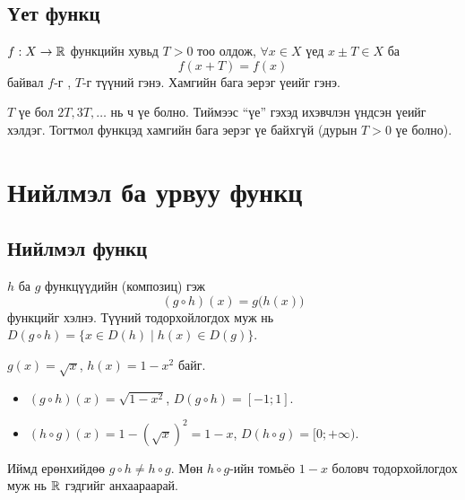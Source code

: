 \subsection{Үет функц}
\begin{definition}
$f:X\to\mathbb{R}$ функцийн хувьд $T>0$ тоо олдож, $\forall x\in X$ үед $x\pm T\in X$ ба
\[
f(x+T)=f(x)
\]
байвал $f$-г , $T$-г түүний  гэнэ. Хамгийн бага эерэг үеийг
 гэнэ.
\end{definition}

\begin{remark}
$T$ үе бол $2T, 3T,\ldots$ нь ч үе болно. Тиймээс ``үе'' гэхэд ихэвчлэн үндсэн үеийг хэлдэг.
Тогтмол функцэд хамгийн бага эерэг үе байхгүй (дурын $T>0$ үе болно).
\end{remark}

\section{Нийлмэл ба урвуу функц}

\subsection{Нийлмэл функц}
\begin{definition}
$h$ ба $g$ функцүүдийн  (композиц) гэж
\[
(g\circ h)(x)=g\bigl(h(x)\bigr)
\]
функцийг хэлнэ. Түүний тодорхойлогдох муж нь
$D(g\circ h)=\{x\in D(h)\mid h(x)\in D(g)\}$.
\end{definition}

\begin{example}
$g(x)=\sqrt{x}$, $h(x)=1-x^2$ байг.
\begin{itemize}
  \item $(g\circ h)(x)=\sqrt{1-x^2}$, \quad $D(g\circ h)=[-1;1]$.
  \item $(h\circ g)(x)=1-(\sqrt{x})^2=1-x$, \quad $D(h\circ g)=[0;+\infty)$.
\end{itemize}
Иймд ерөнхийдөө $g\circ h\neq h\circ g$. Мөн $h\circ g$-ийн томьёо $1-x$ боловч
тодорхойлогдох муж нь $\mathbb{R}$  гэдгийг анхаараарай.
\end{example}

